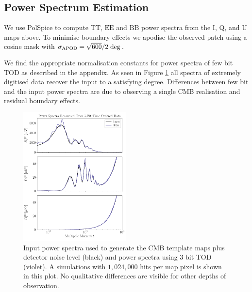 \documentclass[apj]{emulateapj}
\begin{document}
\subsection{Power Spectrum Estimation}
\label{subsec:psestimation}

We use PolSpice \citep{polspice} to compute $\mathrm{TT}$, $\mathrm{EE}$ and $\mathrm{BB}$ power spectra from the I, Q, and U maps above. To minimise boundary effects we apodise the observed patch using a cosine mask with $\sigma_{\mathrm{APOD}} = \sqrt{600}/2 \hspace{0.7ex} \mathrm{deg}$. %

We find the appropriate normalisation constants for power spectra of few bit TOD as described in the appendix. As seen in Figure \ref{fig:psrecover} all spectra of extremely digitised data recover the input to a satisfying degree. Differences between few bit and the input power spectra are due to observing a single CMB realisation and residual boundary effects.


\begin{figure}[htb]\centering
\includegraphics[width=0.5\textwidth,clip]{Plots/psrecovery.pdf}
  \caption[Current ]{
  Input power spectra used to generate the CMB template maps plus detector noise level (black) and power spectra using 3 bit TOD (violet). A simulations with $1,024,000$ hits per map pixel is shown in this plot. No qualitative differences are visible for other depths of observation.
\label{fig:psrecover}
}
\end{figure}
\end{document}
